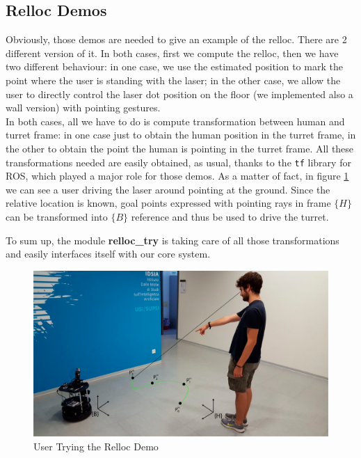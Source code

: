 \subsection{Relloc Demos}
Obviously, those demos are needed to give an example of the relloc. There are 2 different version of it. In both cases, first we compute the relloc, then we have two different behaviour: in one case, we use the estimated position to mark the point where the user is standing with the laser; in the other case, we allow the user to directly control the laser dot position on the floor (we implemented also a wall version) with pointing gestures.\\
In both cases, all we have to do is compute transformation between human and turret frame: in one case just to obtain the human position in the turret frame, in the other to obtain the point the human is pointing in the turret frame. All these transformations needed are easily obtained, as usual, thanks to the \texttt{tf} library for ROS, which played a major role for those demos. As a matter of fact, in figure \ref{fig:rellocDemo} we can see a user driving the laser around pointing at the ground. Since the relative location is known, goal points expressed with pointing rays in frame $\{H\}$ can be transformed into $\{B\}$ reference and thus be used to drive the turret.

To sum up, the module \textbf{relloc\_try} is taking care of all those transformations and easily interfaces itself with our core system.
\begin{figure}
	\centering
	\includegraphics[width=\textwidth]{img/rellocDemo.png}%
	\caption{User Trying the Relloc Demo}
	\label{fig:rellocDemo}
\end{figure}
